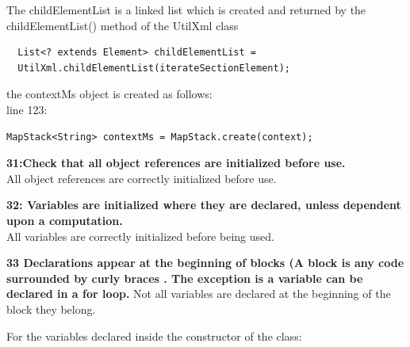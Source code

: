 \documentclass{article}
\begin{document}
\begin{flushleft}
 The childElementList is a linked list which is created and returned by the childElementList() method of the UtilXml class\\
 \vspace{0.5cm}
 \begin{lstlisting}
  List<? extends Element> childElementList = 
  UtilXml.childElementList(iterateSectionElement);
  \end{lstlisting}
 \vspace{0.5cm} 
  
the contextMs object is created as follows:\\


line 123: \\
\vspace{0.5cm} 
\begin{lstlisting}
MapStack<String> contextMs = MapStack.create(context);
\end{lstlisting}
\vspace{0.5cm}

 
\textbf{31:Check that all object references are initialized before use.}\\
\vspace{0.5cm}
All object references are correctly initialized before use.\\
\vspace{0.5cm}

\textbf{32: Variables are initialized where they are declared, unless dependent upon a computation.}\\
\vspace{0.5cm}
All variables are correctly initialized before being used.\\
\vspace{0.5cm}

\textbf{33 Declarations appear at the beginning of blocks (A block is any code surrounded by curly braces . The exception is a variable can be declared in a for loop.}
\vspace{0.5cm}
Not all variables are declared at the beginning of the block they belong.\\
\vspace{0.5cm}

For the variables declared inside the constructor of the class:
\vspace{0.5cm}


\end{flushleft}
\end{document}
